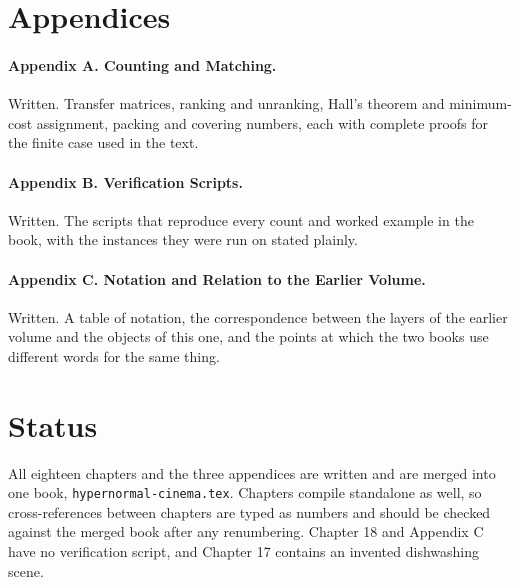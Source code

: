 \documentclass[11pt]{article}
\begin{document}
\section*{Appendices}

\paragraph{Appendix A. Counting and Matching.} Written. Transfer matrices, ranking and unranking, Hall's theorem and minimum-cost assignment, packing and covering numbers, each with complete proofs for the finite case used in the text.

\paragraph{Appendix B. Verification Scripts.} Written. The scripts that reproduce every count and worked example in the book, with the instances they were run on stated plainly.

\paragraph{Appendix C. Notation and Relation to the Earlier Volume.} Written. A table of notation, the correspondence between the layers of the earlier volume and the objects of this one, and the points at which the two books use different words for the same thing.

\section*{Status}

All eighteen chapters and the three appendices are written and are merged into one book, \texttt{hypernormal-cinema.tex}. Chapters compile standalone as well, so cross-references between chapters are typed as numbers and should be checked against the merged book after any renumbering. Chapter 18 and Appendix C have no verification script, and Chapter 17 contains an invented dishwashing scene.
\end{document}
